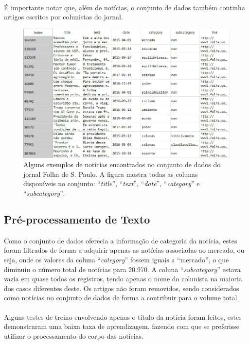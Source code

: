 \documentclass[grad,numbers]{coppe}
\begin{document}
	  	\paragraph{}É importante notar que, além de notícias, o conjunto de dados também continha artigos escritos por colunistas do jornal.
	  	\begin{figure}[h]
	  		\includegraphics[width=15cm]{folha-dataset}
	  		\caption{Alguns exemplos de notícias encontrados no conjunto de dados do jornal Folha de S. Paulo. A figura mostra todas as colunas disponíveis no conjunto: ``\textit{title}'', ``\textit{text}'', ``\textit{date}'', ``\textit{category}'' e ``\textit{subcategory}''.}
	  		\label{fig:folha-dataset-fig}
	  	\end{figure}
  		\subsection{Pré-processamento de Texto}
  			\paragraph{}Como o conjunto de dados oferecia a informação de categoria da notícia, estes foram filtrados de forma a adquirir apenas as notícias associadas ao mercado, ou seja, onde os valores da coluna ``\textit{category}'' fossem iguais a ``mercado'', o que diminuiu o número total de notícias para 20.970. A coluna ``\textit{subcategory}'' estava vazia em quase todos os registros, tendo apenas o nome do colunista na maioria dos casos diferentes deste. Os artigos não foram removidos, sendo considerados como notícias no conjunto de dados de forma a contribuir para o volume total.
  			\paragraph{}Alguns testes de treino envolvendo apenas o título da notícia foram feitos, estes demonstraram uma baixa taxa de aprendizagem, fazendo com que se preferisse utilizar o processamento do corpo das notícias.
\end{document}
